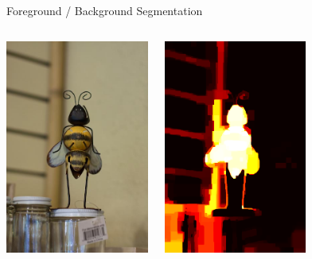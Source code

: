 \documentclass[mathserif]{beamer}
\begin{document}
\begin{frame}{Foreground / Background Segmentation}
\vspace{0.5em}
\begin{columns}[c]
\centering
\includegraphics[width=1.85in]{figures/bee.jpg}

\centering
\includegraphics[width=1.85in]{figures/bee_dr1.png}
\end{columns}
\end{frame}
\end{document}
